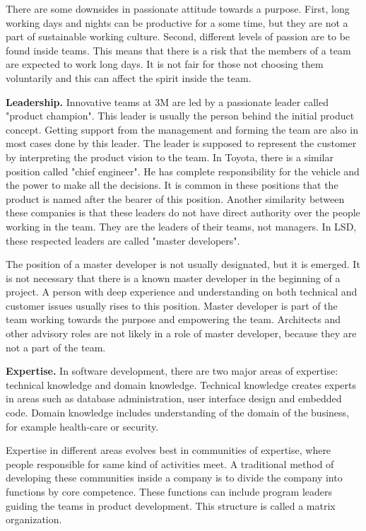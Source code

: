 There are some downsides in passionate attitude towards a purpose. First, long working days and nights can be productive for a some time, but they are not a part of sustainable working culture. Second, different levels of passion are to be found inside teams. This means that there is a risk that the members of a team are expected to work long days. It is not fair for those not choosing them voluntarily and this can affect the spirit inside the team.~\cite{poppendieck2003LSD}

\textbf{Leadership.} Innovative teams at 3M are led by a passionate leader called "product champion". This leader is usually the person behind the initial product concept. Getting support from the management and forming the team are also in most cases done by this leader. The leader is supposed to represent the customer by interpreting the product vision to the team. In Toyota, there is a similar position called "chief engineer". He has complete responsibility for the vehicle and the power to make all the decisions. It is common in these positions that the product is named after the bearer of this position. Another similarity between these companies is that these leaders do not have direct authority over the people working in the team. They are the leaders of their teams, not managers. In LSD, these respected leaders are called "master developers".~\cite{poppendieck2003LSD}

The position of a master developer is not usually designated, but it is emerged. It is not necessary that there is a known master developer in the beginning of a project. A person with deep experience and understanding on both technical and customer issues usually rises to this position. Master developer is part of the team working towards the purpose and empowering the team. Architects and other advisory roles are not likely in a role of master developer, because they are not a part of the team.~\cite{poppendieck2003LSD}

\textbf{Expertise.} In software development, there are two major areas of expertise: technical knowledge and domain knowledge. Technical knowledge creates experts in areas such as database administration, user interface design and embedded code. Domain knowledge includes understanding of the domain of the business, for example health-care or security.~\cite{poppendieck2003LSD}

Expertise in different areas evolves best in communities of expertise, where people responsible for same kind of activities meet. A traditional method of developing these communities inside a company is to divide the company into functions by core competence. These functions can include program leaders guiding the teams in product development. This structure is called a matrix organization.~\cite{poppendieck2003LSD}

